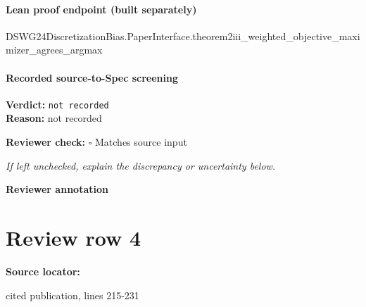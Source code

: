 \documentclass[10pt]{article}
\newcommand{\reviewerbox}{%
  \par\noindent\fbox{\parbox{0.96\linewidth}{\rule{0pt}{0.38in}}}\par
}
\newcommand{\reviewmatch}[1]{%
  \par\noindent\textbf{Reviewer check:} $\square$\; #1\par
  \noindent\emph{If left unchecked, explain the discrepancy or uncertainty below.}\par
}
\begin{document}
\paragraph{Lean proof endpoint (built separately)}\begin{ReviewVerbatim}
DSWG24DiscretizationBias.PaperInterface.theorem2iii_weighted_objective_maximizer_agrees_argmax
\end{ReviewVerbatim}

\paragraph{Recorded source-to-Spec screening}
\textbf{Verdict:} \texttt{not recorded}
\\
\textbf{Reason:} not recorded
\reviewmatch{Matches source input}
\noindent\textbf{Reviewer annotation}\par
\reviewerbox
\clearpage
\hypertarget{source-claim-e99b78e6cf17d423}{}
\section*{Review row 4}
\textbf{Source locator:} {\footnotesize\raggedright cited publication, lines 215-\allowbreak{}231\par}
\end{document}
